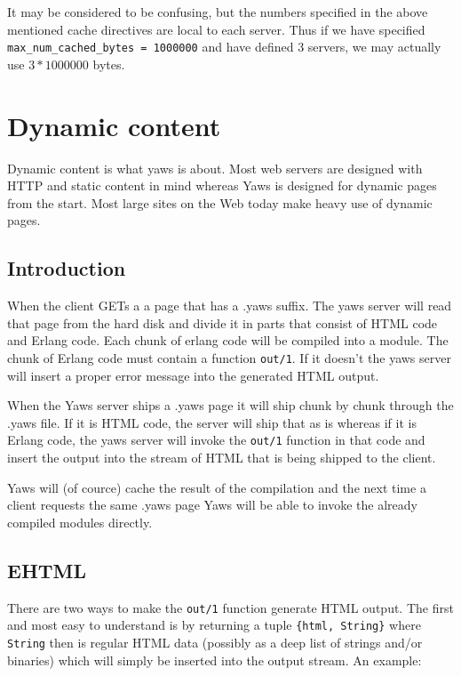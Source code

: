 \documentclass[11pt,oneside,english]{book}
\begin{document}
It may be considered to be confusing, but the numbers specified 
in the above mentioned cache directives are local to each
server. Thus if we have specified \verb+max_num_cached_bytes = 1000000+
and have defined 3 servers, we may actually use $3 * 1000000$ bytes.




\chapter{Dynamic content}

Dynamic content is what yaws is about. Most web servers are designed
with HTTP and static content in mind whereas Yaws is designed 
for dynamic pages from the start.
Most large sites on the Web today make heavy use of dynamic pages.



\section{Introduction}

When the client GETs a a page that has a .yaws suffix. The yaws server
will read that page from the hard disk and divide it in parts
that consist of HTML code and Erlang code. Each chunk of erlang code
will be compiled into a module. The chunk of Erlang code must contain
a function \verb+out/1+. If it doesn't the yaws server will insert a
proper error message into the generated HTML output.

When the Yaws server ships a .yaws page it will ship chunk by chunk
through the .yaws file. If it is HTML code, the server will ship that
as is whereas if it is Erlang code, the yaws server will invoke the
\verb+out/1+ function in that code and insert the output into the stream
of HTML that is being shipped to the client.

Yaws will (of cource) cache the result of the compilation
and the next time a client requests the same .yaws page Yaws will
be able to invoke the already compiled modules directly.


\section{EHTML}

There are two ways to make the \verb+out/1+ function generate HTML
output. The first and most easy to understand is by returning a tuple
\verb+{html, String}+ where \verb+String+ then is regular HTML data
(possibly as a deep list of strings and/or binaries) which will simply
be inserted into the output stream.
An example:
\end{document}

